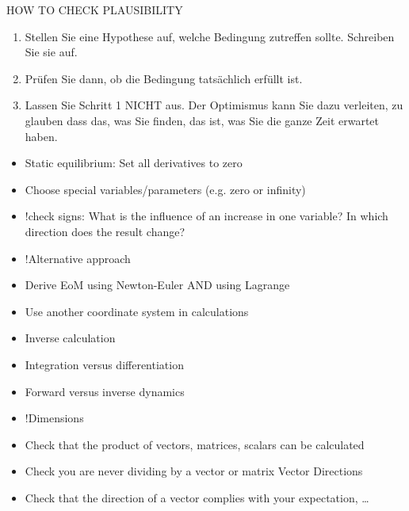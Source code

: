 HOW TO CHECK PLAUSIBILITY
\begin{enumerate}
    \item Stellen Sie eine Hypothese auf, welche Bedingung zutreffen sollte. Schreiben Sie sie auf. 
    \item Prüfen Sie dann, ob die Bedingung tatsächlich erfüllt ist. 
    \item Lassen Sie Schritt 1 NICHT aus. Der Optimismus kann Sie dazu verleiten, zu glauben dass das, was Sie finden, das ist, was Sie die ganze Zeit erwartet haben.
\end{enumerate}
\begin{itemize}
    \item Static equilibrium: Set all derivatives to zero 
        \item Choose special variables/parameters (e.g. zero or infinity)

    \item !check signs: What is the influence of an increase in one variable? In which direction 
does the result change?
    \item !Alternative approach
    \item Derive EoM using Newton-Euler AND using Lagrange
    \item Use another coordinate system in calculations
    \item Inverse calculation 
        \item Integration versus differentiation
    \item Forward versus inverse dynamics
    \item !Dimensions
    \item Check that the product of vectors, matrices, scalars can be calculated
    \item Check you are never dividing by a vector or matrix
Vector Directions
    \item Check that the direction of a vector complies with your expectation, … 
\end{itemize}

